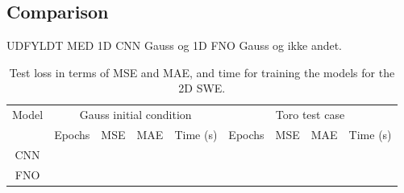 \subsection{Comparison}
UDFYLDT MED 1D CNN Gauss og 1D FNO Gauss og ikke andet.
\begin{table}[H]
    \centering
    \small %
    \begin{tabular}{c|cccc|cccc}
        Model & \multicolumn{4}{c|}{Gauss initial condition} & \multicolumn{4}{c}{Toro test case} \\
        \cline{2-9}
        & Epochs & MSE & MAE & Time (s) & Epochs & MSE & MAE & Time (s) \\
        \hline
        CNN  &
         &
         & 
         &
         &
         &
         &
         &
         
        \\
        \hline
        FNO  &
         &
         &
         &
         &
         &
         &
         &
        
        \\
        \hline
    \end{tabular}
    \caption{Test loss in terms of MSE and MAE, and time for training the models for the 2D SWE.}\label{tab:results_2D_comparison}
\end{table}



